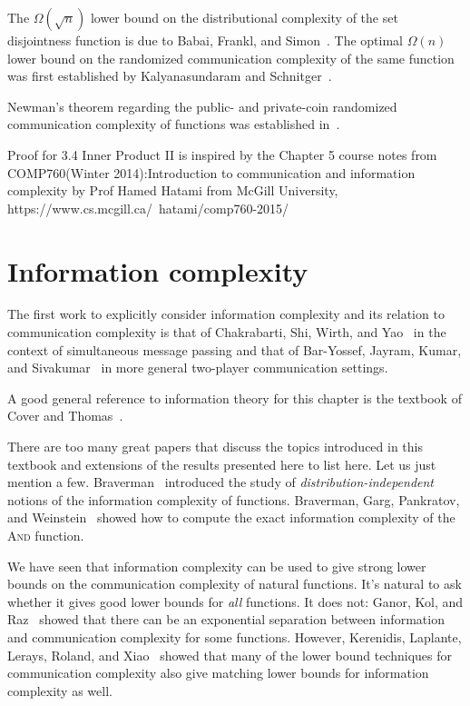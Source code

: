 The $\Omega(\sqrt{n})$ lower bound on the distributional complexity of the set disjointness function is due to Babai, Frankl, and Simon~\cite{BabaiFS86}. The optimal $\Omega(n)$ lower bound on the randomized communication complexity of the same function was first established by Kalyanasundaram and Schnitger~\cite{KalyanasundaramS92}.

Newman's theorem regarding the public- and private-coin randomized communication complexity of functions was established in~\cite{Newman91}.

Proof for 3.4 Inner Product II is inspired by the Chapter 5 course notes from COMP760(Winter 2014):Introduction to communication and information complexity by Prof Hamed Hatami from McGill University, https://www.cs.mcgill.ca/~hatami/comp760-2015/


\section{Information complexity}

The first work to explicitly consider information complexity and its relation to communication complexity is that of Chakrabarti, Shi, Wirth, and Yao~\cite{ChakrabartiSWY01} in the context of simultaneous message passing and that of Bar-Yossef, Jayram, Kumar, and Sivakumar~\cite{BarYossefJKS04} in more general two-player communication settings.

A good general reference to information theory for this chapter is the textbook of Cover and Thomas~\cite{CoverT06}.

There are too many great papers that discuss the topics introduced in this textbook and extensions of the results presented here to list here. Let us just mention a few. Braverman~\cite{Braverman15} introduced the study of \emph{distribution-independent} notions of the information complexity of functions.
Braverman, Garg, Pankratov, and Weinstein~\cite{Braverman13} showed how to compute the exact information complexity of the \textsc{And} function. 

We have seen that information complexity can be used to give strong lower bounds on the communication complexity of natural functions. It's natural to ask whether it gives good lower bounds for \emph{all} functions. It does not: Ganor, Kol, and Raz~\cite{GanorKR16} showed that there can be an exponential separation between information and communication complexity for some functions. However, Kerenidis, Laplante, Lerays, Roland, and Xiao~\cite{Kerenidis15} showed that many of the lower bound techniques for communication complexity also give matching lower bounds for information complexity as well.

